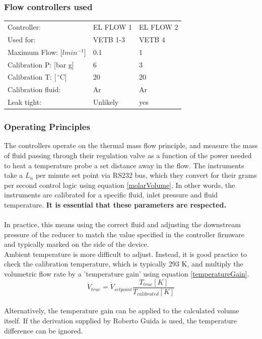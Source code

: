 \documentclass{report}
\begin{document}
\subsubsection{Flow controllers used}
\begin{tabular}{ p{2.4cm} | l l }
Controller: & EL FLOW 1 & EL FLOW 2\\
Used for: & VETB 1-3 & VETB 4 \\
Maximum Flow: [$lmin^{-1}$]& 0.1 & 1 \\
Calibration P: [bar g]& 6 & 3 \\
Calibration T: [$\,^{\circ}\mathrm{C}$]& 20 & 20\\
Calibration fluid: & Ar & Ar\\
Leak tight: & Unlikely & yes\\
\end{tabular}
 
\subsubsection{Operating Principles} \label{sec:operatingPrinciples}
The controllers operate on the thermal mass flow principle, and measure the mass of fluid passing through their regulation valve as a function of the power needed to heat a temperature probe a set distance away in the flow. \cite{bronkhorst} The instruments take a $L_n$ per minute set point via RS232 bus, which they convert for their grams per second control logic using equation \eqref{molarVolume}. In other words, the instruments are calibrated for a specific fluid, inlet pressure and fluid temperature. \textbf{It is essential that these parameters are respected.}\\
\\
In practice, this means using the correct fluid and adjusting the downstream pressure of the reducer to match the value specified in the controller firmware and typically marked on the side of the device. \\Ambient temperature is more difficult to adjust. Instead, it is good practice to check the calibration temperature, which is typically 293 K, and multiply the volumetric flow rate by a 'temperature gain' using equation \eqref{temperatureGain}.
\begin{equation} \label{temperatureGain}
\dot{V}_{true} = \dot{V}_{set point}\frac{T_{true}[K]}{T_{calibrated}[K]}
\end{equation}
\\
Alternatively, the temperature gain can be applied to the calculated volume itself. If the derivation supplied by Roberto Guida is used, the temperature difference can be ignored. \\
\end{document}
